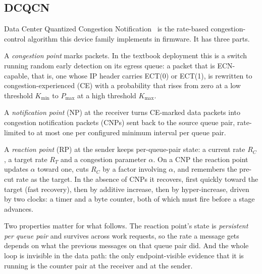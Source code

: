 \subsection{DCQCN}

Data Center Quantized Congestion Notification~\cite{dcqcn2015} is the
rate-based congestion-control algorithm this device family implements in
firmware. It has three parts.

A \emph{congestion point} marks packets. In the textbook deployment this is a
switch running random early detection on its egress queue: a packet that is
ECN-capable, that is, one whose IP header carries ECT(0) or ECT(1), is
rewritten to congestion-experienced (CE) with a probability that rises from
zero at a low threshold $K_{\min}$ to $P_{\max}$ at a high threshold
$K_{\max}$.

A \emph{notification point} (NP) at the receiver turns CE-marked data packets
into congestion notification packets (CNPs) sent back to the source queue pair,
rate-limited to at most one per configured minimum interval per queue pair.

A \emph{reaction point} (RP) at the sender keeps per-queue-pair state: a
current rate $R_C$, a target rate $R_T$ and a congestion parameter $\alpha$. On
a CNP the reaction point updates $\alpha$ toward one, cuts $R_C$ by a factor
involving $\alpha$, and remembers the pre-cut rate as the target. In the
absence of CNPs it recovers, first quickly toward the target (fast recovery),
then by additive increase, then by hyper-increase, driven by two clocks: a
timer and a byte counter, both of which must fire before a stage advances.

Two properties matter for what follows. The reaction point's state is
\emph{persistent per queue pair} and survives across work requests, so the rate
a message gets depends on what the previous messages on that queue pair did.
And the whole loop is invisible in the data path: the only endpoint-visible
evidence that it is running is the counter pair  at the
receiver and  at the sender.
